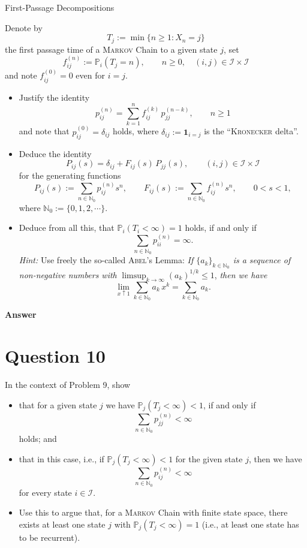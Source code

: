 \documentclass[letterpaper]{article}
\begin{document}
		{\color{deepred}  First-Passage Decompositions} 
		
		Denote by
		\[
		T_j := \min\{n \geq 1 : X_n = j\}
		\]
		the first passage time of a \textsc{Markov} Chain to a given state $j$, set
		\[
		f_{ij}^{(n)} := \mathbb{P}_i(T_j = n), \qquad n \geq 0, \quad (i,j) \in \mathcal{I} \times \mathcal{I}
		\]
		and note $f_{ij}^{(0)} = 0$ even for $i = j$.
		
		\begin{itemize}
			\item[(a)] Justify the identity
			\[
			p_{ij}^{(n)} = \sum_{k=1}^{n} f_{ij}^{(k)}\, p_{jj}^{(n-k)}, \qquad n \geq 1
			\]
			and note that $p_{ij}^{(0)} = \delta_{ij}$ holds, where $\delta_{ij} := \mathbf{1}_{i=j}$ is the ``\textsc{Kronecker} delta''.
			
			\item[(b)] Deduce the identity
			\[
			P_{ij}(s) = \delta_{ij} + F_{ij}(s)\, P_{jj}(s), \qquad (i,j) \in \mathcal{I} \times \mathcal{I}
			\]
			for the generating functions
			\[
			P_{ij}(s) := \sum_{n \in \mathbb{N}_0} p_{ij}^{(n)} s^n, \qquad F_{ij}(s) := \sum_{n \in \mathbb{N}_0} f_{ij}^{(n)} s^n, \qquad 0 < s < 1,
			\]
			where $\mathbb{N}_0 := \{0, 1, 2, \cdots\}$.
			
			\item[(c)] Deduce from all this, that $\mathbb{P}_i(T_i < \infty) = 1$ holds, if and only if
			\[
			\sum_{n \in \mathbb{N}_0} p_{ii}^{(n)} = \infty.
			\]
			\textit{Hint:} Use freely the so-called \textsc{Abel}'s Lemma: \textit{If $\{a_k\}_{k \in \mathbb{N}_0}$ is a sequence of non-negative numbers with} $\limsup_{k \to \infty} (a_k)^{1/k} \leq 1$, \textit{then we have}
			\[
			\lim_{x \uparrow 1} \sum_{k \in \mathbb{N}_0} a_k\, x^k = \sum_{k \in \mathbb{N}_0} a_k.
			\]
		\end{itemize}
		
		\textbf{Answer}
		
		\clearpage
		
		\section{Question 10}
		
		In the context of Problem 9, show
		\begin{itemize}
			\item[(a)] that for a given state $j$ we have $\mathbb{P}_j(T_j < \infty) < 1$, if and only if
			\[
			\sum_{n \in \mathbb{N}_0} p_{jj}^{(n)} < \infty
			\]
			holds; and
			
			\item[(b)] that in this case, i.e., if $\mathbb{P}_j(T_j < \infty) < 1$ for the given state $j$, then we have
			\[
			\sum_{n \in \mathbb{N}_0} p_{ij}^{(n)} < \infty
			\]
			for every state $i \in \mathcal{I}$.
			
			\item[(c)] Use this to argue that, for a \textsc{Markov} Chain with finite state space, there exists at least one state $j$ with $\mathbb{P}_j(T_j < \infty) = 1$ (i.e., at least one state has to be recurrent).
		\end{itemize}
		
\end{document}
